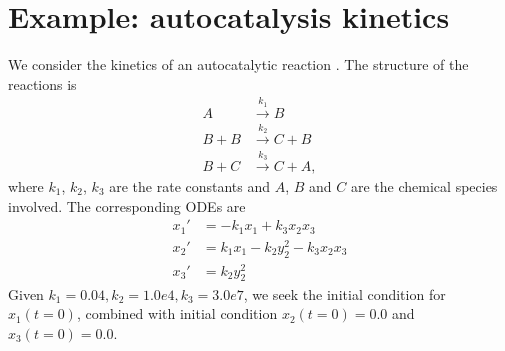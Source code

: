 \documentclass[11pt]{article}
\author{Yi Zhang}
\date{\today}
\title{}
\begin{document}
\section{Example: autocatalysis kinetics}
\label{sec:org0cbdda2}
We consider the kinetics of an autocatalytic reaction \cite{robertson_numerical_1966}. The
structure of the reactions is 
\begin{align*}
A &\xrightarrow{k_1} B\\
B+B &\xrightarrow{k_2} C + B\\
B+C&\xrightarrow{k_3} C + A,
\end{align*}
where \(k_1\), \(k_2\), \(k_3\) are the rate
constants and \(A\), \(B\) and \(C\) are the chemical species
involved. The corresponding ODEs are
\begin{align*}
x_1' &= -k_1x_1 + k_3x_2x_3\\
x_2' &=  k_1x_1 - k_2y_2^2 - k_3x_2x_3\\
x_3' &=  k_2y_2^2
\end{align*}
Given \(k_1=0.04, k_2=1.0e4, k_3=3.0e7\), we seek the
initial condition for \(x_1(t=0)\), combined with initial
condition \(x_2(t=0)=0.0\) and \(x_3(t=0)=0.0\).



\end{document}
